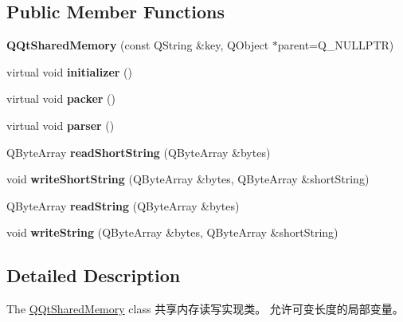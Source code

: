 \subsection*{Public Member Functions}
\begin{DoxyCompactItemize}
\item 
\mbox{\label{class_q_qt_shared_memory_acd12049275027255b9d2dd5d98247d57}} 
{\bfseries Q\+Qt\+Shared\+Memory} (const Q\+String \&key, Q\+Object $\ast$parent=Q\+\_\+\+N\+U\+L\+L\+P\+TR)
\item 
\mbox{\label{class_q_qt_shared_memory_a008dc391d81687d334779ebc4284a1a3}} 
virtual void {\bfseries initializer} ()
\item 
\mbox{\label{class_q_qt_shared_memory_a030856c7926179212ad3512d81229702}} 
virtual void {\bfseries packer} ()
\item 
\mbox{\label{class_q_qt_shared_memory_a500ea5a43b66f322c2a03da007138180}} 
virtual void {\bfseries parser} ()
\item 
\mbox{\label{class_q_qt_shared_memory_a9401a48134c6e310054803ffb704b702}} 
Q\+Byte\+Array {\bfseries read\+Short\+String} (Q\+Byte\+Array \&bytes)
\item 
\mbox{\label{class_q_qt_shared_memory_adfeab4d0ca3c97f884fae62f3bea7428}} 
void {\bfseries write\+Short\+String} (Q\+Byte\+Array \&bytes, Q\+Byte\+Array \&short\+String)
\item 
\mbox{\label{class_q_qt_shared_memory_a8991be38eb638ba73447e5ccd2c20ab3}} 
Q\+Byte\+Array {\bfseries read\+String} (Q\+Byte\+Array \&bytes)
\item 
\mbox{\label{class_q_qt_shared_memory_a43635e13c1e4e4107711bea73f9c02a9}} 
void {\bfseries write\+String} (Q\+Byte\+Array \&bytes, Q\+Byte\+Array \&short\+String)
\end{DoxyCompactItemize}


\subsection{Detailed Description}
The \mbox{\hyperlink{class_q_qt_shared_memory}{Q\+Qt\+Shared\+Memory}} class 共享内存读写实现类。 允许可变长度的局部变量。 

